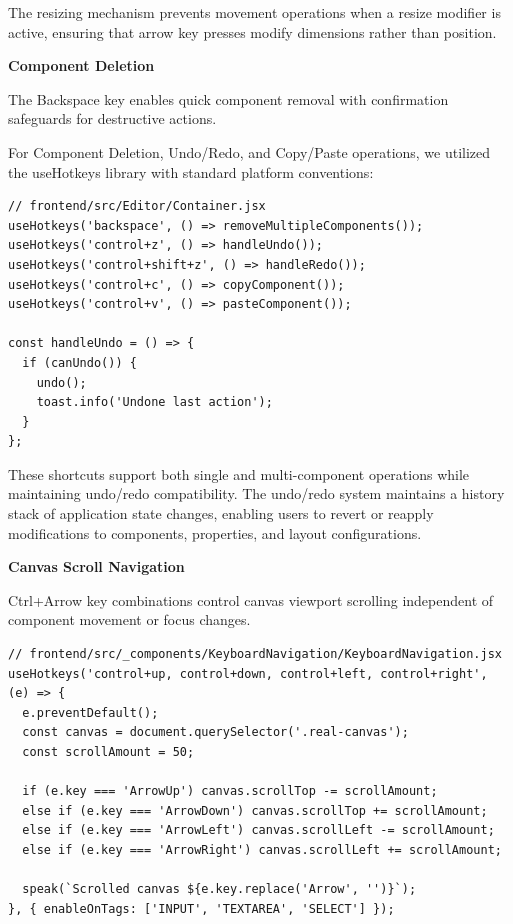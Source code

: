 The resizing mechanism prevents movement operations when a resize modifier is active, ensuring that arrow key presses modify dimensions rather than position.

\textbf{Component Deletion}

The Backspace key enables quick component removal with confirmation safeguards for destructive actions.

For Component Deletion, Undo/Redo, and Copy/Paste operations, we utilized the useHotkeys library with standard platform conventions:

\begin{lstlisting}[caption=Editor Keyboard Shortcuts, label=lst:keyboard-editor-shortcuts]
// frontend/src/Editor/Container.jsx
useHotkeys('backspace', () => removeMultipleComponents());
useHotkeys('control+z', () => handleUndo());
useHotkeys('control+shift+z', () => handleRedo());
useHotkeys('control+c', () => copyComponent());
useHotkeys('control+v', () => pasteComponent());

const handleUndo = () => {
  if (canUndo()) {
    undo();
    toast.info('Undone last action');
  }
};
\end{lstlisting}

These shortcuts support both single and multi-component operations while maintaining undo/redo compatibility. The undo/redo system maintains a history stack of application state changes, enabling users to revert or reapply modifications to components, properties, and layout configurations.

\textbf{Canvas Scroll Navigation}

Ctrl+Arrow key combinations control canvas viewport scrolling independent of component movement or focus changes.

\begin{lstlisting}[caption=Canvas Scroll Keyboard Control, label=lst:keyboard-scroll]
// frontend/src/_components/KeyboardNavigation/KeyboardNavigation.jsx
useHotkeys('control+up, control+down, control+left, control+right', (e) => {
  e.preventDefault();
  const canvas = document.querySelector('.real-canvas');
  const scrollAmount = 50;
  
  if (e.key === 'ArrowUp') canvas.scrollTop -= scrollAmount;
  else if (e.key === 'ArrowDown') canvas.scrollTop += scrollAmount;
  else if (e.key === 'ArrowLeft') canvas.scrollLeft -= scrollAmount;
  else if (e.key === 'ArrowRight') canvas.scrollLeft += scrollAmount;
  
  speak(`Scrolled canvas ${e.key.replace('Arrow', '')}`);
}, { enableOnTags: ['INPUT', 'TEXTAREA', 'SELECT'] });
\end{lstlisting}

